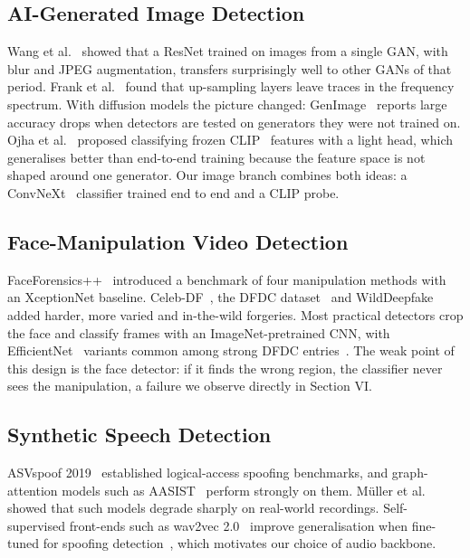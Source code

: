 \documentclass[conference]{IEEEtran}
\begin{document}
\subsection{AI-Generated Image Detection}
Wang et al.~\cite{wang2020} showed that a ResNet trained on images from a single GAN, with blur and JPEG augmentation, transfers surprisingly well to other GANs of that period. Frank et al.~\cite{frank2020} found that up-sampling layers leave traces in the frequency spectrum. With diffusion models the picture changed: GenImage~\cite{genimage} reports large accuracy drops when detectors are tested on generators they were not trained on. Ojha et al.~\cite{ojha2023} proposed classifying frozen CLIP~\cite{clip} features with a light head, which generalises better than end-to-end training because the feature space is not shaped around one generator. Our image branch combines both ideas: a ConvNeXt~\cite{convnext} classifier trained end to end and a CLIP probe.

\subsection{Face-Manipulation Video Detection}
FaceForensics++~\cite{ffpp} introduced a benchmark of four manipulation methods with an XceptionNet baseline. Celeb-DF~\cite{celebdf}, the DFDC dataset~\cite{dfdc} and WildDeepfake~\cite{wilddeepfake} added harder, more varied and in-the-wild forgeries. Most practical detectors crop the face and classify frames with an ImageNet-pretrained CNN, with EfficientNet~\cite{efficientnet} variants common among strong DFDC entries~\cite{dfdc}. The weak point of this design is the face detector: if it finds the wrong region, the classifier never sees the manipulation, a failure we observe directly in Section VI.

\subsection{Synthetic Speech Detection}
ASVspoof 2019~\cite{asvspoof2019} established logical-access spoofing benchmarks, and graph-attention models such as AASIST~\cite{aasist} perform strongly on them. M\"uller et al.~\cite{inthewild} showed that such models degrade sharply on real-world recordings. Self-supervised front-ends such as wav2vec 2.0~\cite{wav2vec2} improve generalisation when fine-tuned for spoofing detection~\cite{tak2022}, which motivates our choice of audio backbone.
\end{document}
